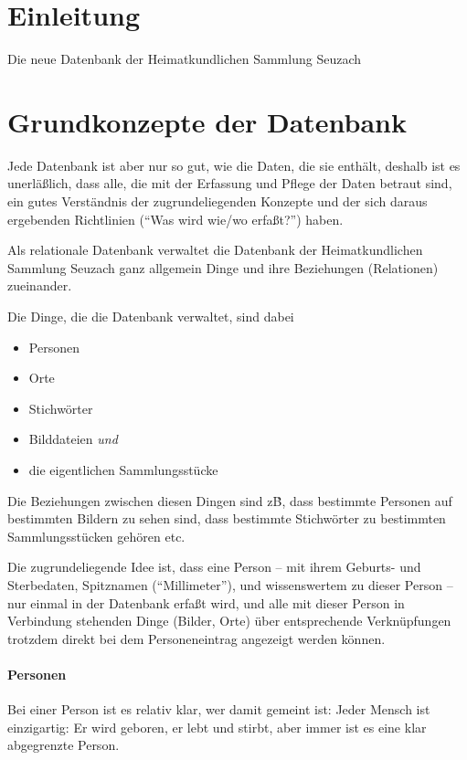 \documentclass{scrartcl}
\begin{document}
\def\DB{Datenbank der Heimatkundlichen Sammlung Seuzach}
\section{Einleitung}

Die neue Datenbank der Heimatkundlichen Sammlung Seuzach 

\section{Grundkonzepte der Datenbank}

Jede Datenbank ist aber nur so gut, wie die Daten, die sie enthält,
deshalb ist es unerläßlich, dass alle, die mit der Erfassung und
Pflege der Daten betraut sind, ein gutes Verständnis der
zugrundeliegenden Konzepte und der sich daraus ergebenden Richtlinien
(``Was wird wie/wo erfaßt?'')  haben.

Als relationale Datenbank verwaltet die \DB{} ganz allgemein Dinge und ihre Beziehungen
(Relationen) zueinander.

Die Dinge, die die Datenbank verwaltet, sind dabei
\begin{itemize}
\item Personen
\item Orte
\item Stichwörter
\item Bilddateien \textit{und}
\item die eigentlichen Sammlungsstücke
\end{itemize}

Die Beziehungen zwischen diesen Dingen sind z\.B, dass bestimmte
Personen auf bestimmten Bildern zu sehen sind, dass bestimmte Stichwörter
zu bestimmten Sammlungsstücken gehören etc.

Die zugrundeliegende Idee ist, dass eine Person -- mit ihrem Geburts- und Sterbedaten,
Spitznamen (``Millimeter''), und wissenswertem zu dieser Person -- nur
einmal in der Datenbank erfaßt wird, und alle mit dieser Person in Verbindung
stehenden Dinge (Bilder, Orte) über entsprechende Verknüpfungen trotzdem direkt
bei dem Personeneintrag angezeigt werden können.

\paragraph{Personen} Bei einer Person ist es relativ klar, wer damit gemeint ist:
Jeder Mensch ist einzigartig: Er wird geboren, er lebt und stirbt, aber immer ist
es eine klar abgegrenzte Person.
\end{document}
